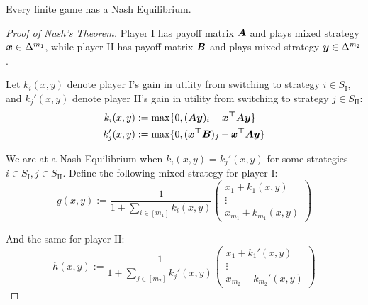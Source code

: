 	\begin{theorem}[Nash, 1951]
		Every finite game has a Nash Equilibrium.
	\end{theorem}
	\begin{proof}[Proof of Nash's Theorem]
		Player I has payoff matrix $\bm{A}$ and plays mixed strategy
		$\bm{x} \in \Delta^{m_1}$, while player II has payoff matrix
		$\bm{B}$ and plays mixed strategy $\bm{y} \in \Delta^{m_2}$.

		Let $k_i(x,y)$ denote player I's gain in utility from switching to
		strategy $i \in S_\text{I}$, and $k_j'(x,y)$ denote player II's gain in
		utility from switching to strategy $j \in S_\text{II}$:
		\begin{equation}
			\begin{split}
				k_i(x,y) & := \max \{ 0, (\bm{Ay})_i - \bm{x^\top A y} \} \\
				k_j'(x,y) & := \max \{ 0, (\bm{x^\top B})_j - \bm{x^\top A y} \} \\
			\end{split}
		\end{equation}

		We are at a Nash Equilibrium when $k_i(x,y) = k_j'(x,y)$ for some
		strategies $i \in S_\text{I}, j \in S_\text{II}$. Define the following
		mixed strategy for player I:
		\begin{equation}
			g(x,y) := \frac{1}{1 + \sum_{i \in [m_1]} k_i(x,y)} \begin{pmatrix}
				x_1 + k_1(x,y) \\
				\vdots \\
				x_{m_1} + k_{m_1}(x,y)
			\end{pmatrix}
		\end{equation}

		And the same for player II:
		\begin{equation}
			h(x,y) := \frac{1}{1 + \sum_{j \in [m_2]} k_j'(x,y)} \begin{pmatrix}
				x_1 + k_1'(x,y) \\
				\vdots \\
				x_{m_2} + k_{m_2}'(x,y)
			\end{pmatrix}
		\end{equation}


\end{proof}
